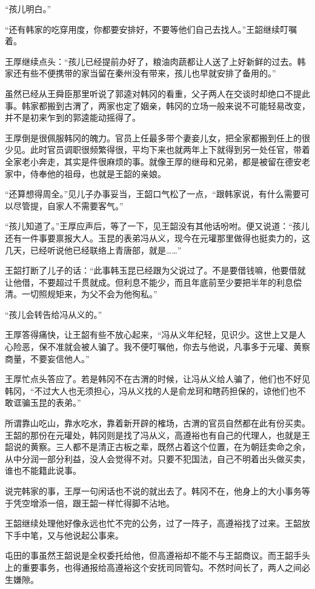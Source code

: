 “孩儿明白。”

“还有韩家的吃穿用度，你都要安排好，不要等他们自己去找人。”王韶继续叮嘱着。

王厚继续点头：“孩儿已经提前办好了，粮油肉蔬都让人送了上好新鲜的过去。韩家还有些不便携带的家当留在秦州没有带来，孩儿也早就安排了备用的。”

虽然已经从王舜臣那里听说了郭逵对韩冈的看重，父子两人在交谈时却绝口不提此事。韩家都搬到古渭了，两家也定了姻亲，韩冈的立场一般来说不可能轻易改变，并不是初来乍到的郭逵能动摇得了。

王厚倒是很佩服韩冈的魄力。官员上任最多带个妻妾儿女，把全家都搬到任上的很少见。此时官员调职很频繁得很，平均下来也就两年上下就得到另一处任官，带着全家老小奔走，其实是件很麻烦的事。就像王厚的继母和兄弟，都是被留在德安老家中，侍奉他的祖母，也就是王韶的亲娘。

“还算想得周全。”见儿子办事妥当，王韶口气松了一点，“跟韩家说，有什么需要可以尽管提，自家人不需要客气。”

“孩儿知道了。”王厚应声后，等了一下，见王韶没有其他话吩咐。便又说道：“孩儿还有一件事要禀报大人。玉昆的表弟冯从义，现今在元瓘那里做得也挺卖力的，这几天，已经听说他已经联络上青唐部，就是……”

王韶打断了儿子的话：“此事韩玉昆已经跟为父说过了。不是要借钱嘛，他要借就让他借，不要超过千贯就成。但利息不能少，而且年底前至少要把半年的利息偿清。一切照规矩来，为父不会为他徇私。”

“孩儿会转告给冯从义的。”

王厚答得痛快，让王韶有些不放心起来，“冯从义年纪轻，见识少。这世上又是人心险恶，保不准就会被人骗了。我不便叮嘱他，你去与他说，凡事多于元瓘、黄察商量，不要妄信他人。”

王厚忙点头答应了。若是韩冈不在古渭的时候，让冯从义给人骗了，他们也不好见韩冈，“不过大人也无须担心，冯从义找的人是俞龙珂和瞎药担保的，谅他们也不敢诓骗玉昆的表弟。”

所谓靠山吃山，靠水吃水，靠着新开辟的榷场，古渭的官员自然都在此有份买卖。王韶的那份在元瓘处，韩冈则是找了冯从义，高遵裕也有自己的代理人，也就是王韶说的黄察。三人都不是清正古板之辈，既然占着这个位置，在为朝廷卖命之余，从中分润一部分利益，没人会觉得不对。只要不犯国法，自己不明着出头做买卖，谁也不能籍此说事。

说完韩家的事，王厚一句闲话也不说的就出去了。韩冈不在，他身上的大小事务等于凭空增添一倍，跟王韶一样忙得脚不沾地。

王韶继续处理他好像永远也忙不完的公务，过了一阵子，高遵裕找了过来。王韶放下手中笔，又与他说起公事来。

屯田的事虽然王韶说是全权委托给他，但高遵裕却不能不与王韶商议。而王韶手头上的重要事务，也得通报给高遵裕这个安抚司同管勾。不然时间长了，两人之间必生嫌隙。

